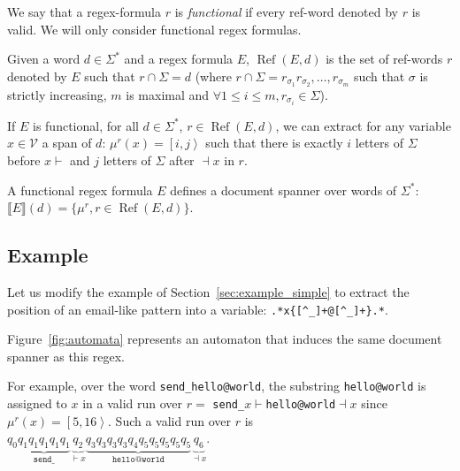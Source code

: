 \documentclass[12px]{article}
\DeclareMathOperator{\Ref}{Ref}
\newcommand{\Span}[1]{\left[ #1 \right\rangle}
\begin{document}
      We say that a regex-formula $r$ is \textit{functional} if every ref-word
      denoted by $r$ is valid. We will only consider functional regex formulas.

      Given a word $d \in \Sigma^*$ and a regex formula $E$, $\Ref(E, d)$ is the
      set of ref-words $r$ denoted by $E$ such that $r \cap \Sigma = d$ (where
      $r \cap \Sigma = r_{\sigma_1} r_{\sigma_2}, \ldots, r_{\sigma_m}$ such
      that $\sigma$ is strictly increasing, $m$ is maximal and $\forall 1 \leq
      i \leq m, r_{\sigma_i} \in \Sigma$).

      If $E$ is functional, for all $d \in \Sigma^*$, $r \in \Ref(E, d)$, we can
      extract for any variable $x \in \mathcal{V}$ a span of $d$: $\mu^r (x) =
      \Span{i, j}$ such that there is exactly $i$ letters of $\Sigma$ before
      $x{\vdash}$ and $j$ letters of $\Sigma$ after ${\dashv}x$ in $r$.

      A functional regex formula $E$ defines a document spanner over words of
      $\Sigma^*$: $\llbracket E \rrbracket (d) = \{\mu^r, r \in \Ref(E, d)\}$.


    \subsection{Example}
      Let us modify the example of Section~\ref{sec:example_simple} to extract
      the position of an email-like pattern into a variable:
      \texttt{.*x\{[\textasciicircum\_]+@[\textasciicircum\_]+\}.*}.

      Figure~\ref{fig:automata} represents an automaton that induces the same
      document spanner as this regex.

      For example, over the word \texttt{send\_hello@world}, the substring
      \texttt{hello@world} is assigned to $x$ in a valid run over $r =$
      \texttt{send\_$x{\vdash}$hello@world${\dashv}x$} since $\mu^r(x) =
      \Span{5, 16}$. Such a valid run over $r$ is $q_0 \underbrace{q_1 q_1 q_1
      q_1 q_1}_\texttt{send\_} \underbrace{q_2}_{{\vdash}x} \underbrace{q_3 q_3
      q_3 q_3 q_4 q_5 q_5 q_5 q_5 q_5}_\texttt{hello@world}
      \underbrace{q_6}_{{\dashv}x}$.
\end{document}
